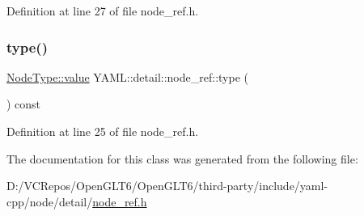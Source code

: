 Definition at line 27 of file node\+\_\+ref.\+h.

\mbox{\label{class_y_a_m_l_1_1detail_1_1node__ref_abee2b9c7917291f4563134d37ae9351c}} 
\subsubsection{\texorpdfstring{type()}{type()}}
{\footnotesize\ttfamily \mbox{\hyperlink{struct_y_a_m_l_1_1_node_type_af83cf3f3c2eca0bf0eae1bbf981e86c4}{Node\+Type\+::value}} Y\+A\+M\+L\+::detail\+::node\+\_\+ref\+::type (\begin{DoxyParamCaption}{ }\end{DoxyParamCaption}) const\hspace{0.3cm}{\ttfamily [inline]}}



Definition at line 25 of file node\+\_\+ref.\+h.



The documentation for this class was generated from the following file\+:\begin{DoxyCompactItemize}
\item 
D\+:/\+V\+C\+Repos/\+Open\+G\+L\+T6/\+Open\+G\+L\+T6/third-\/party/include/yaml-\/cpp/node/detail/\mbox{\hyperlink{node__ref_8h}{node\+\_\+ref.\+h}}\end{DoxyCompactItemize}
